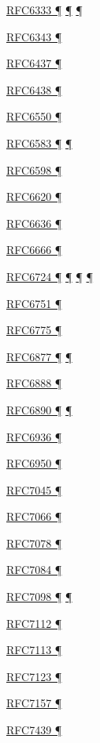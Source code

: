\documentclass[
]{article}
\begin{document}
\hyperref[dual-stack-scenarios]{RFC6333 ¶}
\hyperref[translation-and-ipv4-as-a-service]{¶} \hyperref[tunnels]{¶}

\hyperref[obsolete-techniques]{RFC6343 ¶}

\hyperref[traffic-class-and-flow-label]{RFC6437 ¶}

\hyperref[traffic-class-and-flow-label]{RFC6438 ¶}

\hyperref[routing]{RFC6550 ¶}

\hyperref[address-resolution]{RFC6583 ¶}
\hyperref[layer-2-considerations]{¶}

\hyperref[address-planning]{RFC6598 ¶}

\hyperref[layer-2-considerations]{RFC6620 ¶}

\hyperref[address-resolution]{RFC6636 ¶}

\hyperref[filtering]{RFC6666 ¶}

\hyperref[how-an-application-programmer-sees-ipv6]{RFC6724 ¶}
\hyperref[dns]{¶} \hyperref[source-and-destination-address-selection]{¶}
\hyperref[multi-prefix-operation]{¶}

\hyperref[obsolete-techniques]{RFC6751 ¶}

\hyperref[address-resolution]{RFC6775 ¶}

\hyperref[dual-stack-scenarios]{RFC6877 ¶}
\hyperref[translation-and-ipv4-as-a-service]{¶}

\hyperref[dual-stack-scenarios]{RFC6888 ¶}

\hyperref[addresses]{RFC6890 ¶} \hyperref[filtering]{¶}

\hyperref[transport-protocols]{RFC6936 ¶}

\hyperref[multi-prefix-operation]{RFC6950 ¶}

\hyperref[filtering]{RFC7045 ¶}

\hyperref[managed-configuration]{RFC7066 ¶}

\hyperref[multi-prefix-operation]{RFC7078 ¶}

\hyperref[routing]{RFC7084 ¶}

\hyperref[traffic-class-and-flow-label]{RFC7098 ¶}
\hyperref[topology-obfuscation]{¶}

\hyperref[layer-2-considerations]{RFC7112 ¶}

\hyperref[layer-2-considerations]{RFC7113 ¶}

\hyperref[filtering]{RFC7123 ¶}

\hyperref[multihoming]{RFC7157 ¶}

\hyperref[tunnels]{RFC7439 ¶}
\end{document}

